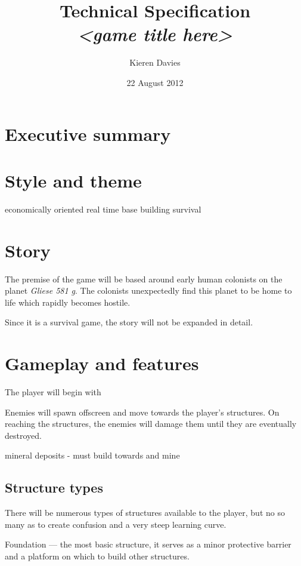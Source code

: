 \documentclass[a4paper,titlepage]{article}
\begin{document}
\title{Technical Specification\\
       \emph{<game title here>}}
\author{Kieren Davies}
\date {22 August 2012}
\maketitle

\section{Executive summary}

\section{Style and theme}
economically oriented
real time
base building
survival

\section{Story}

The premise of the game will be based around early human colonists on the planet \emph{Gliese 581 g}.  The colonists unexpectedly find this planet to be home to life which rapidly becomes hostile.

Since it is a survival game, the story will not be expanded in detail.

\section{Gameplay and features}

The player will begin with 

Enemies will spawn offscreen and move towards the player's structures.  On reaching the structures, the enemies will damage them until they are eventually destroyed.

mineral deposits - must build towards and mine

\subsection{Structure types}

There will be numerous types of structures available to the player, but no so many as to create confusion and a very steep learning curve.

Foundation --- the most basic structure, it serves as a minor protective barrier and a platform on which to build other structures.
\end{document}
